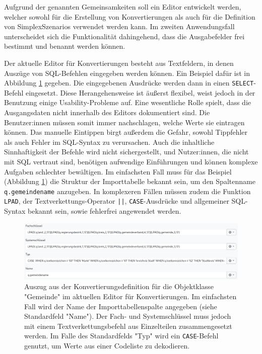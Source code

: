 Aufgrund der genannten Gemeinsamkeiten soll ein Editor entwickelt werden, welcher sowohl für die Erstellung von Konvertierungen als auch für die Definition von SimplexSzenarios verwendet werden kann. Im zweiten Anwendungsfall unterscheidet sich die Funktionalität dahingehend, dass die Ausgabefelder frei bestimmt und benannt werden können.

Der aktuelle Editor für Konvertierungen besteht aus Textfeldern, in denen Auszüge von \ac{SQL}-Befehlen eingegeben werden können. Ein Beispiel dafür ist in Abbildung \ref{fig:conversion-gemeinde} gegeben. Die eingegebenen Ausdrücke werden dann in einen \texttt{SELECT}-Befehl eingesetzt. Diese Herangehensweise ist äußerst flexibel, weist jedoch in der Benutzung einige Usability-Probleme auf. Eine wesentliche Rolle spielt, dass die Ausgangsdaten nicht innerhalb des Editors dokumentiert sind. Die Benutzer:innen müssen somit immer nachschlagen, welche Werte sie eintragen können. Das manuelle Eintippen birgt außerdem die Gefahr, sowohl Tippfehler als auch Fehler im \ac{SQL}-Syntax zu verursachen. Auch die inhaltliche Sinnhaftigkeit der Befehle wird nicht sichergestellt, und Nutzer:innen, die nicht mit SQL vertraut sind, benötigen aufwendige Einführungen und können komplexe Aufgaben schlechter bewältigen. Im einfachsten Fall muss für das Beispiel (Abbildung \ref{fig:conversion-gemeinde}) die Struktur der Importtabelle bekannt sein, um den Spaltenname \texttt{q.gemeindename} anzugeben. In komplexeren Fällen müssen zudem die Funktion \texttt{LPAD}, der Textverkettungs-Operator \texttt{||}, \texttt{CASE}-Ausdrücke und allgemeiner \ac{SQL}-Syntax bekannt sein, sowie fehlerfrei angewendet werden.

\begin{figure}[ht]
  \centering
  \includegraphics[width=.95\textwidth]{assets/conversion-gemeinde.png}
  \caption[Auszug einer Konvertierungsdefinition im aktuellen Editor]{Auszug aus der Konvertierungsdefinition für die Objektklasse "Gemeinde" im aktuellen Editor für Konvertierungen. Im einfachsten Fall wird der Name der Importtabellenspalte angegeben (siehe Standardfeld "Name"). Der Fach- und Systemschlüssel muss jedoch mit einem Textverkettungsbefehl aus Einzelteilen zusammengesetzt werden. Im Falle des Standardfelds "Typ" wird ein \texttt{CASE}-Befehl genutzt, um Werte aus einer Codeliste zu dekodieren.}
  \label{fig:conversion-gemeinde}
\end{figure}

